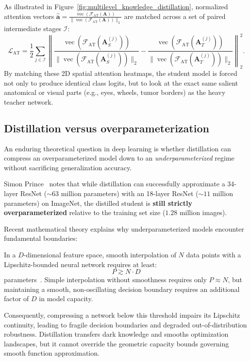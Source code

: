 As illustrated in Figure~\ref{fig:multilevel_knowledge_distillation}, normalized attention vectors $\hat{\mathbf{a}} = \frac{\operatorname{vec}(\mathcal{F}_{\text{AT}}(\mathbf{A}))}{\|\operatorname{vec}(\mathcal{F}_{\text{AT}}(\mathbf{A}))\|_2}$ are matched across a set of paired intermediate stages $\mathcal{I}$:
\begin{equation}
\mathcal{L}_{\text{AT}} = \frac{1}{2} \sum_{j \in \mathcal{I}} \left\| \frac{\operatorname{vec}(\mathcal{F}_{\text{AT}}(\mathbf{A}_S^{(j)}))}{\|\operatorname{vec}(\mathcal{F}_{\text{AT}}(\mathbf{A}_S^{(j)}))\|_2} - \frac{\operatorname{vec}(\mathcal{F}_{\text{AT}}(\mathbf{A}_T^{(j)}))}{\|\operatorname{vec}(\mathcal{F}_{\text{AT}}(\mathbf{A}_T^{(j)}))\|_2} \right\|_2^2.
\label{eq:attention_transfer_loss}
\end{equation}
By matching these 2D spatial attention heatmaps, the student model is forced not only to produce identical class logits, but to look at the exact same salient anatomical or visual parts (e.g., eyes, wheels, tumor borders) as the heavy teacher network.

\subsection{Distillation versus overparameterization}
\label{sec:distillation_overparameterization_limits}

An enduring theoretical question in deep learning is whether distillation can compress an overparameterized model down to an \textit{underparameterized} regime without sacrificing generalization accuracy.

Simon Prince~\cite{prince2023understanding} notes that while distillation can successfully approximate a 34-layer ResNet ($\sim 63$ million parameters) with an 18-layer ResNet ($\sim 11$ million parameters) on ImageNet, the distilled student is \textbf{still strictly overparameterized} relative to the training set size ($1.28$ million images).

Recent mathematical theory explains why underparameterized models encounter fundamental boundaries:
\begin{theorem}
In a $D$-dimensional feature space, smooth interpolation of $N$ data points with a Lipschitz-bounded neural network requires at least:
\begin{equation}
P \gtrsim N \cdot D
\end{equation}
parameters~\cite{bubeck2021universal}. Simple interpolation without smoothness requires only $P \approx N$, but maintaining a smooth, non-oscillating decision boundary requires an additional factor of $D$ in model capacity.
\end{theorem}
Consequently, compressing a network below this threshold impairs its Lipschitz continuity, leading to fragile decision boundaries and degraded out-of-distribution robustness. Distillation transfers dark knowledge and smooths optimization landscapes, but it cannot override the geometric capacity bounds governing smooth function approximation.

